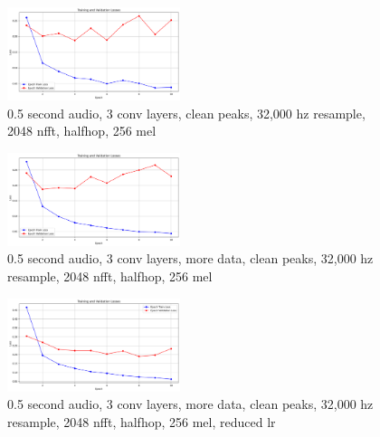 \documentclass[twocolumn]{article}
\begin{document}
\begin{figure}
\centering
\includegraphics[width=0.45\textwidth]{figures/loss_plot_halfs_3conv_cleanpeaks_3200resample_2048nfft_halfhop_256nmel.png}
\caption{0.5 second audio, 3 conv layers, clean peaks, 32,000 hz resample, 2048 nfft, halfhop, 256 mel}
\label{fig:halfs_3conv_cleanpeaks_3200resample_2048nfft_halfhop_256nmel}
\end{figure}

\begin{figure}
\centering
\includegraphics[width=0.45\textwidth]{figures/loss_plot_moredata_halfs_3conv_cleanpeaks_3200resample_2048nfft_halfhop_256nmel.png}
\caption{0.5 second audio, 3 conv layers, more data, clean peaks, 32,000 hz resample, 2048 nfft, halfhop, 256 mel}
\label{fig:halfs_3conv_moredata_cleanpeaks_3200resample_2048nfft_halfhop_256nmel}
\end{figure}

\begin{figure}
\centering
\includegraphics[width=0.45\textwidth]{figures/loss_plot_moredata_halfs_3conv_cleanpeaks_3200resample_2048nfft_halfhop_256nmel_drop_lr.png}
\caption{0.5 second audio, 3 conv layers, more data, clean peaks, 32,000 hz resample, 2048 nfft, halfhop, 256 mel, reduced lr}
\label{fig:halfs_3conv_moredata_cleanpeaks_3200resample_2048nfft_halfhop_256nmel_reduced_lr}
\end{figure}
\end{document}
